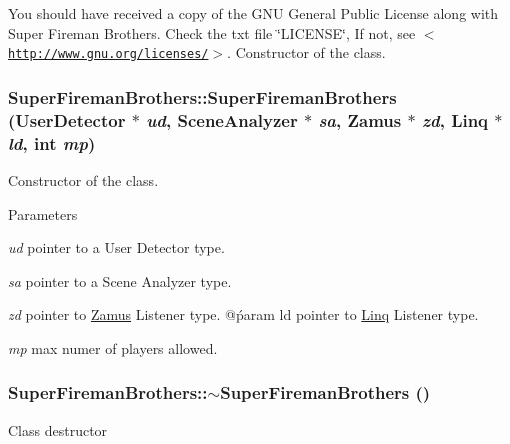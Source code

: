 You should have received a copy of the GNU General Public License along with Super Fireman Brothers. Check the txt file \char`\"{}LICENSE\char`\"{}, If not, see $<$\href{http://www.gnu.org/licenses/}{\tt http://www.gnu.org/licenses/}$>$. Constructor of the class. \hypertarget{classSuperFiremanBrothers_a936a3dd9d6ee953f7f064f56affd85b3}{
\subsubsection[{SuperFiremanBrothers}]{\setlength{\rightskip}{0pt plus 5cm}SuperFiremanBrothers::SuperFiremanBrothers ({\bf UserDetector} $\ast$ {\em ud}, \/  SceneAnalyzer $\ast$ {\em sa}, \/  {\bf Zamus} $\ast$ {\em zd}, \/  {\bf Linq} $\ast$ {\em ld}, \/  int {\em mp})}}
\label{classSuperFiremanBrothers_a936a3dd9d6ee953f7f064f56affd85b3}
Constructor of the class. 
\begin{DoxyParams}{Parameters}
\item[{\em ud}]pointer to a User Detector type. \item[{\em sa}]pointer to a Scene Analyzer type. \item[{\em zd}]pointer to \hyperlink{classZamus}{Zamus} Listener type. @ṕaram ld pointer to \hyperlink{classLinq}{Linq} Listener type. \item[{\em mp}]max numer of players allowed. \end{DoxyParams}
\hypertarget{classSuperFiremanBrothers_a662a1f55259ebe79b80200e0dc0d25a8}{
\subsubsection[{$\sim$SuperFiremanBrothers}]{\setlength{\rightskip}{0pt plus 5cm}SuperFiremanBrothers::$\sim$SuperFiremanBrothers ()}}
\label{classSuperFiremanBrothers_a662a1f55259ebe79b80200e0dc0d25a8}
Class destructor 


